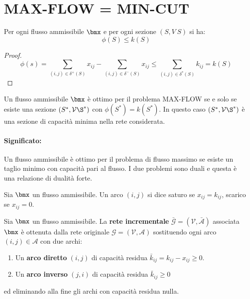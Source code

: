 \documentclass[\main/main.tex]{subfiles}
\begin{document}
\section{MAX-FLOW = MIN-CUT}

\begin{theorem}
  \label{serve_qui}
  Per ogni flusso ammissibile $\bmx$ e per ogni sezione $(S, V\ S)$ si ha:
  \[
    \phi(S) \leq k(S)
  \]
\end{theorem}

\begin{proof}
  \[
    \phi(s) = \sum_{(i,j) \in \delta^{+}(S)} x_{ij} - \sum_{(i,j) \in \delta^{-}(S)} x_{ij} \leq \sum_{(i,j) \in  \delta^{*}(S)} k_{ij} = k(S)
  \]
\end{proof}

\begin{theorem}
  Un flusso ammissibile $\bmx$ è ottimo per il problema MAX-FLOW se e solo se esiste una sezione $(S^*, \mathcal{V}\S^*)$ con $\phi(S^*)=k(S^*)$. In questo caso $(S^*, \mathcal{V}\S^*)$ è una sezione di capacità minima nella rete considerata.
  \paragraph*{Significato:} Un flusso ammissibile è ottimo per il problema di flusso massimo se esiste un taglio minimo con capacità pari al flusso. I due problemi sono duali e questa è una relazione di dualità forte.
\end{theorem}

\begin{definition}
  Sia $\bmx$ un flusso ammissibile. Un arco $(i,j)$ si dice saturo se $x_{ij}=k_{ij}$, scarico se $x_{ij}=0$.
\end{definition}

\begin{definition}
  Sia $\bmx$ un flusso ammissibile. La \textbf{rete incrementale} $\bar{\mathcal{G}} = (\mathcal{V}, \bar{\mathcal{A}})$ associata $\bmx$ è ottenuta dalla rete originale $\mathcal{G} = (\mathcal{V}, \mathcal{A})$ sostituendo ogni arco $(i,j) \in \mathcal{A}$ con due archi:
  \begin{enumerate}
    \item Un \textbf{arco diretto} $(i,j)$ di capacità residua $\bar{k}_{ij} = k_{ij} - x_{ij} \geq 0$.
    \item Un \textbf{arco inverso} $(j,i)$ di capacità residua $\bar{k}_{ij} \geq 0$
  \end{enumerate}
  ed eliminando alla fine gli archi con capacità residua nulla.
\end{definition}
\end{document}
